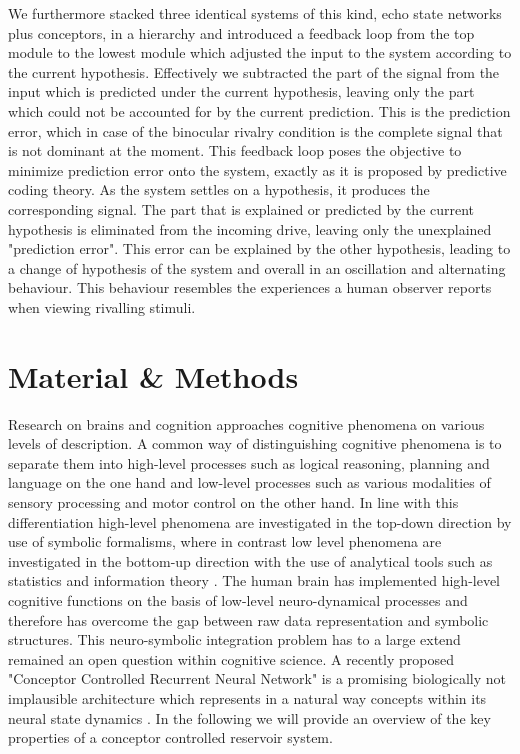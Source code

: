 \documentclass{frontiersSCNS} %
\begin{document}
    
    We furthermore stacked three identical systems of this kind, echo state networks plus conceptors, in a hierarchy and introduced a feedback loop from the top module to the lowest module which adjusted the input to the system according to the current hypothesis. Effectively we subtracted the part of the signal from the input which is predicted under the current hypothesis, leaving only the part which could not be accounted for by the current prediction. This is the prediction error, which in case of the binocular rivalry condition is the complete signal that is not dominant at the moment. This feedback loop poses the objective to minimize prediction error onto the system, exactly as it is proposed by predictive coding theory. As the system settles on a hypothesis, it produces the corresponding signal. The part that is explained or predicted by the current hypothesis is eliminated from the incoming drive, leaving only the unexplained "prediction error". This error can be explained by the other hypothesis, leading to a change of hypothesis of the system and overall in an oscillation and alternating behaviour. This behaviour resembles the experiences a human observer reports when viewing rivalling stimuli. 

\section{Material \& Methods}

Research on brains and cognition approaches cognitive phenomena on various levels of description. A common way of distinguishing cognitive phenomena is to separate them into high-level processes such as logical reasoning, planning and language on the one hand and low-level processes such as various modalities of sensory processing and motor control on the other hand. In line with this differentiation high-level phenomena are investigated in the top-down direction by use of symbolic formalisms, where in contrast low level phenomena are investigated in the bottom-up direction with the use of analytical tools such as statistics and information theory \cite{Gaehde2014, Jaeger2014}. The human brain has implemented high-level cognitive functions on the basis of low-level neuro-dynamical processes and therefore has overcome the gap between raw data representation and symbolic structures. This neuro-symbolic integration problem has to a large extend remained an open question within cognitive science. A recently proposed "Conceptor Controlled Recurrent Neural Network" is a promising biologically not implausible architecture which represents in a natural way concepts within its neural state dynamics \cite{Jaeger2014}. In the following we will provide an overview of the key properties of a conceptor controlled reservoir system.
    
\end{document}
